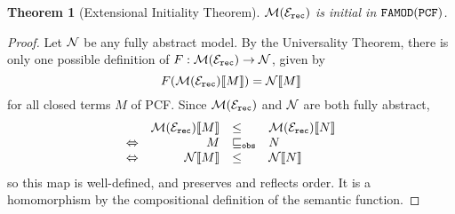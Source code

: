 \documentclass[11pt]{article}
\newtheorem{theorem}{Theorem}[section]
\newcommand{\E}{{\cal E}}
\newcommand{\M}{{\cal M}}
\begin{document}
\begin{theorem}[Extensional Initiality Theorem]


$\M(\E_{\tt rec})$ is initial in ${\tt FAMOD(PCF)}$.
\end{theorem}
\newcommand{\N}{{\cal N}}
\begin{proof} Let $\N$ be any fully abstract model. By the
Universality Theorem, there is only one possible definition of
$F:\M(\E_{\tt rec})\rightarrow {\cal N}$, given by $$F(\M(\E_{\tt
rec})\llbracket M\rrbracket)={\cal N}\llbracket M\rrbracket$$ for
all closed terms $M$ of PCF. Since $\M(\E_{\tt rec})$ and $\cal N$
are both fully abstract,
\[\begin{array}{lrll}
& \M(\E_{\tt rec})\llbracket M\rrbracket & \leq& \M(\E_{\tt rec})\llbracket N
\rrbracket \\
\Leftrightarrow & M & \sqsubseteq_{\tt obs} & N \\
\Leftrightarrow & {\cal N}\llbracket M\rrbracket & \leq  &
{\cal N}\llbracket N\rrbracket
\end{array}\]
so this map is well-defined, and preserves and reflects order. It
is a homomorphism by the compositional definition of the semantic
function.
\end{proof}
\end{document}

